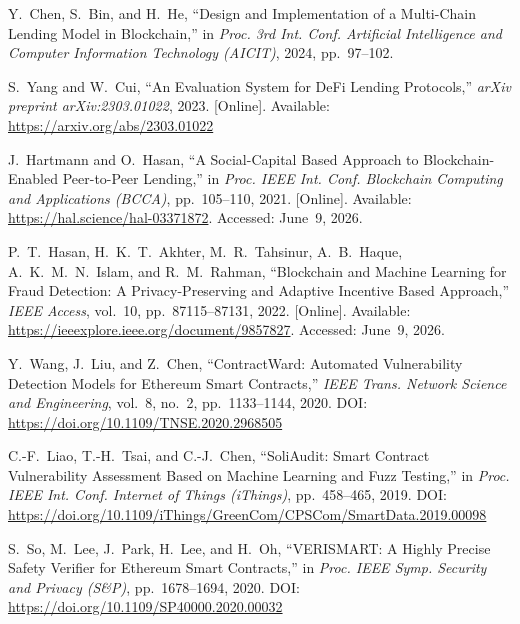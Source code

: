 \documentclass[12pt,a4paper]{report}
\begin{document}
{\begin{enumerate}[label={[\arabic*]}]
\item Y.~Chen, S.~Bin, and H.~He, ``Design and Implementation of a Multi-Chain Lending Model in Blockchain,'' in \textit{Proc. 3rd Int. Conf. Artificial Intelligence and Computer Information Technology (AICIT)}, 2024, pp.~97--102.
\item S.~Yang and W.~Cui, ``An Evaluation System for DeFi Lending Protocols,'' \textit{arXiv preprint arXiv:2303.01022}, 2023. [Online]. Available: \url{https://arxiv.org/abs/2303.01022}
\item J.~Hartmann and O.~Hasan, ``A Social-Capital Based Approach to Blockchain-Enabled Peer-to-Peer Lending,'' in \textit{Proc. IEEE Int. Conf. Blockchain Computing and Applications (BCCA)}, pp.~105--110, 2021. [Online]. Available: \url{https://hal.science/hal-03371872}. Accessed: June~9, 2026.
\item P.~T.~Hasan, H.~K.~T.~Akhter, M.~R.~Tahsinur, A.~B.~Haque, A.~K.~M.~N.~Islam, and R.~M.~Rahman, ``Blockchain and Machine Learning for Fraud Detection: A Privacy-Preserving and Adaptive Incentive Based Approach,'' \textit{IEEE Access}, vol.~10, pp.~87115--87131, 2022. [Online]. Available: \url{https://ieeexplore.ieee.org/document/9857827}. Accessed: June~9, 2026.
\item Y.~Wang, J.~Liu, and Z.~Chen, ``ContractWard: Automated Vulnerability Detection Models for Ethereum Smart Contracts,'' \textit{IEEE Trans. Network Science and Engineering}, vol.~8, no.~2, pp.~1133--1144, 2020. DOI: \url{https://doi.org/10.1109/TNSE.2020.2968505}

\item C.-F.~Liao, T.-H.~Tsai, and C.-J.~Chen, ``SoliAudit: Smart Contract Vulnerability Assessment Based on Machine Learning and Fuzz Testing,'' in \textit{Proc. IEEE Int. Conf. Internet of Things (iThings)}, pp.~458--465, 2019. DOI: \url{https://doi.org/10.1109/iThings/GreenCom/CPSCom/SmartData.2019.00098}

\item S.~So, M.~Lee, J.~Park, H.~Lee, and H.~Oh, ``VERISMART: A Highly Precise Safety Verifier for Ethereum Smart Contracts,'' in \textit{Proc. IEEE Symp. Security and Privacy (S\&P)}, pp.~1678--1694, 2020. DOI: \url{https://doi.org/10.1109/SP40000.2020.00032}


\end{enumerate}}
\end{document}
